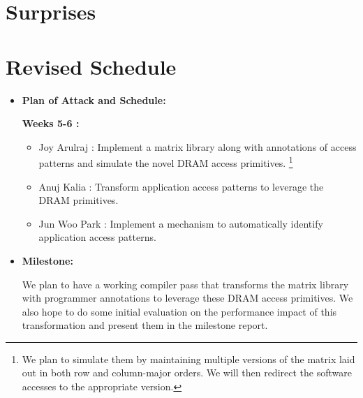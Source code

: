 \documentclass[letterpaper]{article}
\begin{document}
\section{Surprises}

\section{Revised Schedule}

\begin{itemize}

\item \textbf{Plan of Attack and Schedule:}

\textbf{Weeks 5-6 :}

\begin{itemize}
\item Joy Arulraj : Implement a matrix library along with annotations of access
patterns and simulate the novel DRAM access primitives. \footnote{We plan to
simulate them by maintaining multiple versions of the matrix laid out in both row
and column-major orders. We will then redirect the software accesses to
the appropriate version.}

\item Anuj Kalia : Transform application access patterns to leverage the DRAM
primitives.

\item Jun Woo Park : Implement a mechanism to automatically identify application
access patterns.
\end{itemize}

\item \textbf{Milestone:} 

We plan to have a working compiler pass that transforms the matrix library 
with programmer annotations to leverage these DRAM access primitives.
We also hope to do some initial evaluation on the performance impact
of this transformation and present them in the milestone report.

\end{itemize}



\end{document}
